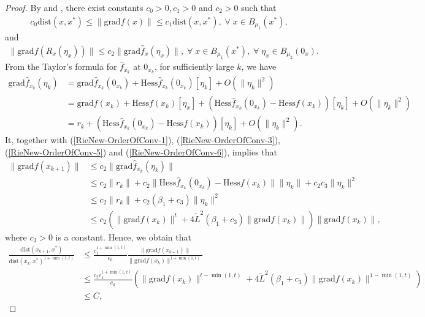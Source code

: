 \documentclass[11pt]{article}
\numberwithin{equation}{section}
\begin{document}
\begin{proof}
  	By \cite[Lemma 7.4.8]{AbsMahSep2008} and \cite[Lemma 7.4.9]{AbsMahSep2008}, there exist constants $c_0>0,c_1>0$ and $c_2>0$ such that 
  	\begin{align}
  		c_0\mathrm{dist}(x,x^*) \le \|\mathrm{grad}f(x)\| \le c_1 \mathrm{dist}(x,x^*),\;\forall\;x\in B_{\mu_1}(x^*), \label{RieNew-OrderOfConv-5}
  	\end{align}  
  	and 
  	\begin{align} \label{RieNew-OrderOfConv-6}
  		\|\mathrm{grad}f(R_x(\eta_x))\| \le c_2 \|\mathrm{grad}\hat{f}_x(\eta_x)\|,\;\forall\;x\in B_{\mu_1}(x^*),\;\forall\;\eta_{x}\in B_{\mu_2}(0_{x}).
  	\end{align}
  	From the Taylor's formula for $\hat{f}_{x_k}$ at $0_{x_k}$, for sufficiently large $k$, we have 
  	 \begin{align*} 
  	 \mathrm{grad}\hat{f}_{x_{k}}(\eta_{k})&= \mathrm{grad}\hat{f}_{x_{k}}(0_{x_{k}}) + \mathrm{Hess}\hat{f}_{x_{k}}(0_{x_{k}})[\eta_{k}] + O(\|\eta_{k}\|^{2}) \\ &= \mathrm{grad}f(x_{k}) + \mathrm{Hess}f(x_{k})[\eta_{x}] + (\mathrm{Hess}\hat{f}_{x_{k}}(0_{x_{k}})-\mathrm{Hess}f(x_{k}))[\eta_{k}] + O(\|\eta_{k}\|^{2})  \\ &=  r_{k} + (\mathrm{Hess}\hat{f}_{x_{k}}(0_{x_{k}})-\mathrm{Hess}f(x_{k}))[\eta_{k}] + O(\|\eta_{k}\|^{2}).
  	 \end{align*} 
  	 It, together with (\ref{RieNew-OrderOfConv-1}), (\ref{RieNew-OrderOfConv-3}), (\ref{RieNew-OrderOfConv-5}) and (\ref{RieNew-OrderOfConv-6}), implies that 
  	  \begin{align*} 
  	  \|\mathrm{grad}f(x_{k+1})\| &\le c_{2}\|\mathrm{grad}\hat{f}_{x_{k}}(\eta_{k})\| \\ & \le c_{2}\|r_{k}\| + c_{2}\|\mathrm{Hess}\hat{f}_{x_{k}}(0_{x_{k}})-\mathrm{Hess}f(x_{k})\|\|\eta_{k}\| + c_{2}c_{3}\|\eta_{k}\|^{2} \\ & \le c_{2}\|r_{k}\| + c_{2}(\beta_{1}+c_{3})\|\eta_{k}\|^{2} \\ & \le c_{2}(\|\mathrm{grad}f(x_{k})\|^{t} + 4\tilde{L}^{2}(\beta_{1}+c_{3})\|\mathrm{grad}f(x_{k})\|)\|\mathrm{grad}f(x_{k})\| ,
  	  \end{align*} 
  	  where $c_3>0$ is a constant. Hence, we obtain that 
  	  \begin{equation} \nonumber 	  	
  	   \begin{aligned}   	   
  	   \frac{\mathrm{dist}(x_{k+1},x^{*})}{\mathrm{dist}(x_{k},x^{*})^{1+\min(1,t)}} & \le \frac{c_{1}^{1+\min(1,t)}}{c_{0}}\frac{\|\mathrm{grad}f(x_{k+1})\|}{\|\mathrm{grad}f(x_{k})\|^{1+\min(1,t)}} \\ & \le \frac{c_{2}c_{1}^{1+\min(1,t)}}{c_{0}}\left( \|\mathrm{grad}f(x_{k})\|^{t-\min(1,t)} + 4\tilde{L}^{2}(\beta_{1}+c_{3})\|\mathrm{grad}f(x_{k})\|^{1-\min(1,t)} \right)  \\ & \le C, 

\end{aligned}
\end{equation}
\end{proof}
\end{document}
